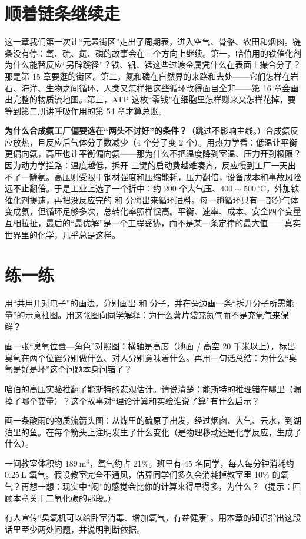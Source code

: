 \section{顺着链条继续走}

这一章我们第一次让“元素街区”走出了周期表，进入空气、骨骼、农田和烟囱。链条没有停：氧、硫、氮、磷的故事会在三个方向上继续。第一，哈伯用的铁催化剂为什么能替反应“另辟蹊径”？铁、钒、锰这些过渡金属凭什么在表面上撮合分子？那是第 15 章要逛的街区。第二，氮和磷在自然界的来路和去处——它们怎样在岩石、海洋、生物之间循环，人类又怎样把这些循环改得面目全非——第 16 章会画出完整的物质流地图。第三，ATP 这枚“零钱”在细胞里怎样赚来又怎样花掉，要等到第二册讲呼吸作用的第 54 章才算总账。

\begin{tiaozhan}
\textbf{为什么合成氨工厂偏要选在“两头不讨好”的条件？}（跳过不影响主线。）合成氨反应放热，且反应后气体分子数减少（4 个分子变 2 个）。用热力学看：低温让平衡更偏向氨，高压也让平衡偏向氨——那为什么不把温度降到室温、压力开到极限？因为动力学拦路：温度越低，拆开  三键的启动费越难凑齐，反应慢到工厂一天出不了一罐氨。高压则受限于钢材强度和压缩能耗，压力翻倍，设备成本和事故风险远不止翻倍。于是工业上选了一个折中：约 200 个大气压、$400\sim 500\,^{\circ}\mathrm{C}$，外加铁催化剂提速，再把没反应完的  和  分离出来循环进料。每一趟循环只有一部分气体变成氨，但循环足够多次，总转化率照样很高。平衡、速率、成本、安全四个变量互相拉扯，最后的“最优解”是一个工程妥协，而不是某一条定律的最大值——真实世界里的化学，几乎总是这样。
\end{tiaozhan}

\section*{练一练}

\begin{sikaoti}
\item 用“共用几对电子”的画法，分别画出  和  分子，并在旁边画一条“拆开分子所需能量”的示意柱图。用这张图向同学解释：为什么薯片袋充氮气而不是充氧气来保鲜？
\item 画一张“臭氧位置—角色”对照图：横轴是高度（地面 / 高空 20 千米以上），标出臭氧在两个位置分别做什么、对人分别意味着什么。再用一句话总结：为什么“臭氧是好是坏”这个问题本身问错了？
\item 哈伯的高压实验推翻了能斯特的悲观估计。请说清楚：能斯特的推理错在哪里（漏掉了哪个变量）？这个故事对“理论计算和实验谁说了算”有什么启示？
\item 画一条酸雨的物质流箭头图：从煤里的硫原子出发，经过烟囱、大气、云水，到湖泊里的鱼。在每个箭头上注明发生了什么变化（是物理移动还是化学反应，生成了什么）。
\item 一间教室体积约 $189\ \mathrm{m^3}$，氧气约占 21\%。班里有 45 名同学，每人每分钟消耗约 $0.25\ \mathrm{L}$ 氧气。假设教室完全不通风，估算同学们多久会消耗掉教室里 10\% 的氧气？再想一想：现实中“闷”的感觉会比你的计算来得早得多，为什么？（提示：回顾本章关于二氧化碳的那段。）
\item 有人宣传“臭氧机可以给卧室消毒、增加氧气，有益健康”。用本章的知识指出这段话里至少两处问题，并说明判断依据。
\end{sikaoti}
